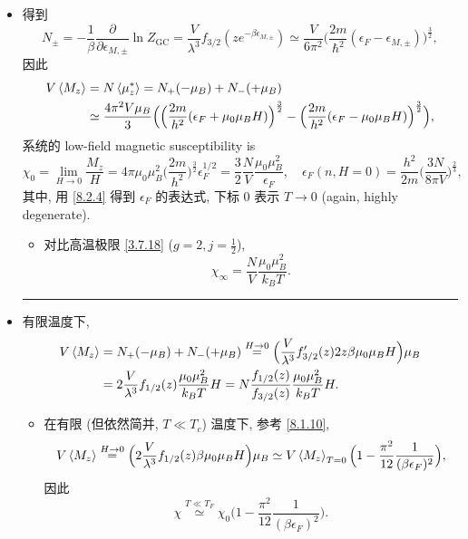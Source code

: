 \begin{itemize}
	\item 得到
	\begin{equation} \label{8.2.4}
		N_{\pm} = - \frac{1}{\beta} \frac{\partial}{\partial \epsilon_{M, \pm}} \ln Z_\text{GC} = \frac{V}{\lambda^3} f_{3 / 2}(z e^{- \beta \epsilon_{M, \pm}}) \simeq \frac{V}{6 \pi^2} \Big( \frac{2 m}{\hbar^2} (\epsilon_F - \epsilon_{M, \pm}) \Big)^{\frac{3}{2}},
	\end{equation}
	因此
	\begin{align}
		V \braket{M_z} &= N \braket{\mu^*_z} = N_+ (- \mu_B) + N_- (+ \mu_B) \notag \\
		&\simeq \frac{4 \pi^2 V \mu_B}{3} \Big( \Big( \frac{2 m}{h^2} (\epsilon_F + \mu_0 \mu_B H) \Big)^{\frac{3}{2}} - \Big( \frac{2 m}{h^2} (\epsilon_F - \mu_0 \mu_B H) \Big)^{\frac{3}{2}} \Big),
	\end{align}
	系统的 low-field magnetic susceptibility is
	\begin{equation}
		\chi_0 = \lim_{H \rightarrow 0} \frac{M_z}{H} = 4 \pi \mu_0 \mu_B^2 \Big( \frac{2 m}{h^2} \Big)^{\frac{3}{2}} \epsilon_F^{1 / 2} = \boxed{\frac{3}{2} \frac{N}{V} \frac{\mu_0 \mu_B^2}{\epsilon_F}}, \quad \epsilon_F(n, H = 0) = \frac{h^2}{2 m} \Big( \frac{3 N}{8 \pi V} \Big)^{\frac{2}{3}},
	\end{equation}
	其中, 用 \eqref{8.2.4} 得到 $\epsilon_F$ 的表达式, 下标 $0$ 表示 $T \rightarrow 0$ (again, highly degenerate).
	
	\begin{itemize}
		\item 对比高温极限 \eqref{3.7.18} ($g = 2, j = \frac{1}{2}$),
		\begin{equation} \label{8.2.7}
			\boxed{\chi_\infty = \frac{N}{V} \frac{\mu_0 \mu_B^2}{k_B T}}.
		\end{equation}
	\end{itemize}
	
	\noindent\rule[0.5ex]{\linewidth}{0.5pt} %
	
	\item 有限温度下,
	\begin{align}
		V \braket{M_z} &= N_+ (- \mu_B) + N_- (+ \mu_B) \overset{H \rightarrow 0}{=} \Big( \frac{V}{\lambda^3} f'_{3 / 2}(z) 2 z \beta \mu_0 \mu_B H \Big) \mu_B \notag \\
		&= 2 \frac{V}{\lambda^3} f_{1 / 2}(z) \frac{\mu_0 \mu_B^2}{k_B T} H = N \frac{f_{1 / 2}(z)}{f_{3 / 2}(z)} \frac{\mu_0 \mu_B^2}{k_B T} H.
	\end{align}
	\begin{itemize}
		\item 在有限 (但依然简并, $T \ll T_c$) 温度下, 参考 \eqref{8.1.10},
		\begin{equation}
			V \braket{M_z} \overset{H \rightarrow 0}{=} \Big( 2 \frac{V}{\lambda^3} f_{1 / 2}(z) \beta \mu_0 \mu_B H \Big) \mu_B \simeq V \braket{M_z}_{T = 0} \Big( 1 - \frac{\pi^2}{12} \frac{1}{(\beta \epsilon_F)^2} \Big),
		\end{equation}
		因此
		\begin{equation}
			\chi \overset{T \ll T_F}{\simeq} \chi_0 \Big( 1 - \frac{\pi^2}{12} \frac{1}{(\beta \epsilon_F)^2} \Big).
		\end{equation}
		

\end{itemize}
\end{itemize}
